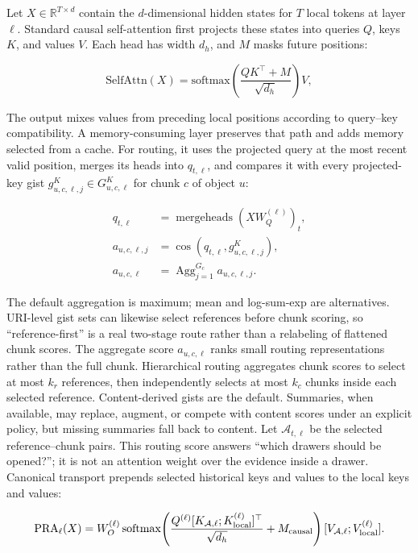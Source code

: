 \documentclass[11pt]{article}
\begin{document}
Let $X \in \mathbb{R}^{T \times d}$ contain the $d$-dimensional hidden states for $T$
local tokens at layer $\ell$.  Standard causal self-attention first projects these states
into queries $Q$, keys $K$, and values $V$.  Each head has width $d_h$, and $M$ masks
future positions:

\begin{equation}
\mathrm{SelfAttn}(X) =
\mathrm{softmax}\left(\frac{QK^\top + M}{\sqrt{d_h}}\right)V,
\end{equation}

The output mixes values from preceding local positions according to query--key
compatibility.  A memory-consuming layer preserves that path and adds memory selected from a cache.
For routing, it uses the projected query at the most recent valid position, merges its
heads into $q_{t,\ell}$, and compares it with every projected-key gist
$g^K_{u,c,\ell,j}\in G^K_{u,c,\ell}$ for chunk $c$ of object $u$:

\begin{align}
q_{t,\ell} &= \operatorname{mergeheads}(XW_Q^{(\ell)})_t,\\
a_{u,c,\ell,j} &= \cos(q_{t,\ell},g^K_{u,c,\ell,j}),\\
a_{u,c,\ell} &= \operatorname{Agg}_{j=1}^{G_c}a_{u,c,\ell,j}.
\end{align}

The default aggregation is maximum; mean and log-sum-exp are alternatives.  URI-level
gist sets can likewise select references before chunk scoring, so ``reference-first'' is
a real two-stage route rather than a relabeling of flattened chunk scores.  The aggregate
score $a_{u,c,\ell}$ ranks small routing representations rather than the
full chunk.  Hierarchical routing aggregates chunk scores to select at most $k_r$
references, then independently selects at most $k_c$ chunks inside each selected
reference.  Content-derived gists are the default.  Summaries, when available, may
replace, augment, or compete with content scores under an explicit policy, but missing
summaries fall back to content.  Let $\mathcal{A}_{t,\ell}$ be the selected
reference--chunk pairs.  This routing score answers ``which drawers should be opened?'';
it is not an attention weight over the evidence inside a drawer. Canonical transport
prepends selected historical keys and values to the local keys and values:

\begin{equation}
\mathrm{PRA}_{\ell}(X)=W_O^{(\ell)}\,
\mathrm{softmax}\!\left(
\frac{Q^{(\ell)}[K_{\mathcal A,\ell};K_{\rm local}^{(\ell)}]^\top}
{\sqrt{d_h}}+M_{\rm causal}\right)
[V_{\mathcal A,\ell};V_{\rm local}^{(\ell)}].
\end{equation}
\end{document}
